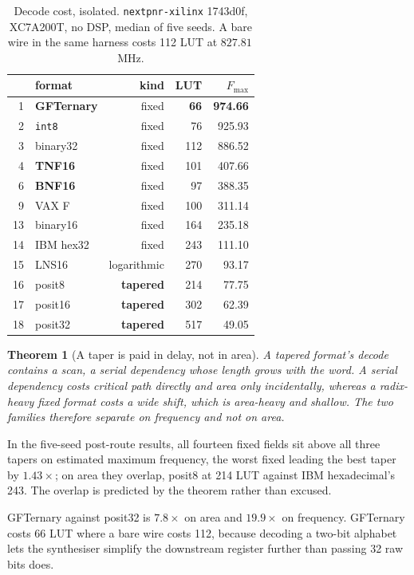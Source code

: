 \documentclass[11pt]{article}
\newtheorem{theorem}{Theorem}
\theoremstyle{definition}
\begin{document}
\begin{table}[t]\centering
\caption{Decode cost, isolated. \texttt{nextpnr-xilinx} 1743d0f, XC7A200T, no
DSP, median of five seeds. A bare wire in the same harness costs 112 LUT at
$827.81$\,MHz.}
\label{tab:cleandecode}
\small
\begin{tabular}{rlrrr}
\toprule
& format & kind & LUT & $F_{\max}$ \\
\midrule
1 & \textbf{GFTernary} & fixed & \textbf{66} & \textbf{974.66} \\
2 & \texttt{int8} & fixed & 76 & 925.93 \\
3 & binary32 & fixed & 112 & 886.52 \\
4 & \textbf{TNF16} & fixed & 101 & 407.66 \\
6 & \textbf{BNF16} & fixed & 97 & 388.35 \\
9 & VAX F & fixed & 100 & 311.14 \\
13 & binary16 & fixed & 164 & 235.18 \\
14 & IBM hex32 & fixed & 243 & 111.10 \\
15 & LNS16 & logarithmic & 270 & 93.17 \\
16 & posit8 & \textbf{tapered} & 214 & 77.75 \\
17 & posit16 & \textbf{tapered} & 302 & 62.39 \\
18 & posit32 & \textbf{tapered} & 517 & 49.05 \\
\bottomrule
\end{tabular}
\end{table}

\begin{theorem}[A taper is paid in delay, not in area]
\label{thm:taperdelay}
A tapered format's decode contains a scan, a serial dependency whose length grows
with the word. A serial dependency costs critical path directly and area only
incidentally, whereas a radix-heavy fixed format costs a wide shift, which is
area-heavy and shallow. The two families therefore separate on frequency and not
on area.
\end{theorem}

In the five-seed post-route results, all fourteen fixed fields sit above all three tapers on estimated maximum frequency, the
worst fixed leading the best taper by $1.43\times$; on area they overlap, posit8
at 214 LUT against IBM hexadecimal's 243. The overlap is predicted by the theorem
rather than excused.

GFTernary against posit32 is $7.8\times$ on area and $19.9\times$ on frequency.
GFTernary costs 66 LUT where a bare wire costs 112, because decoding a two-bit
alphabet lets the synthesiser simplify the downstream register further than
passing 32 raw bits does.
\end{document}
